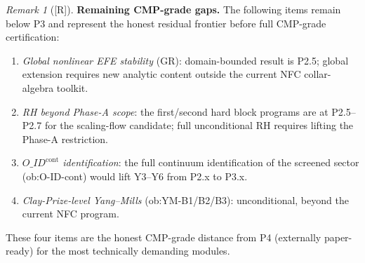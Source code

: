 \documentclass[12pt,oneside]{amsbook}
\theoremstyle{plain}
\theoremstyle{definition}
\theoremstyle{remark}
\newtheorem{remark}[theorem]{Remark}
\newcommand{\status}[1]{\textup{[#1]}}
\begin{document}
\begin{remark}[\status{R}]\label{rem:cmp-residual-gaps}
\textbf{Remaining CMP-grade gaps.}
The following items remain below P3 and represent the
honest residual frontier before full CMP-grade certification:
\begin{enumerate}[label=\textup{(\arabic*)}]
  \item \emph{Global nonlinear EFE stability} (GR):
    domain-bounded result is P2.5; global extension requires new
    analytic content outside the current NFC collar-algebra toolkit.
  \item \emph{RH beyond Phase-A scope}: the first/second hard block
    programs are at P2.5--P2.7 for the scaling-flow candidate; full
    unconditional RH requires lifting the Phase-A restriction.
  \item \emph{$O\_ID^{\mathrm{cont}}$ identification}: the full
    continuum identification of the screened sector (ob:O-ID-cont)
    would lift Y3--Y6 from P2.x to P3.x.
  \item \emph{Clay-Prize-level Yang--Mills} (ob:YM-B1/B2/B3):
    unconditional, beyond the current NFC program.
\end{enumerate}
These four items are the honest CMP-grade distance from P4
(externally paper-ready) for the most technically demanding modules.
\end{remark}
\end{document}
